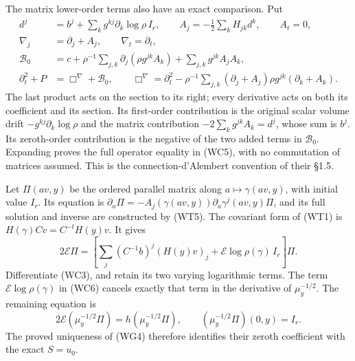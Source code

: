 \documentclass[
  11pt,
]{article}
\begin{document}
The matrix lower-order terms also have an exact comparison. Put \[
\begin{split}
 d^j&=b^j+\sum_k g^{kj}\partial_k\log\rho\,I_r,\qquad
 A_j=-\frac12\sum_k H_{jk}d^k,\qquad A_t=0,\\
 \nabla_j&=\partial_j+A_j,\qquad \nabla_t=\partial_t,\\
 \mathcal B_0&=c+\rho^{-1}\sum_{j,k}
                       \partial_j(\rho g^{jk}A_k)
                    +\sum_{j,k}g^{jk}A_jA_k,\\
 \partial_t^2+P&=\Box^\nabla+\mathcal B_0,\qquad
 \Box^\nabla=\partial_t^2-
       \rho^{-1}\sum_{j,k}(\partial_j+A_j)
                              \rho g^{jk}(\partial_k+A_k).
\end{split}
 \tag{WC5}
\] The last product acts on the section to its right; every derivative
acts on both its coefficient and its section. Its first-order
contribution is the original scalar volume drift
\(-g^{kj}\partial_k\log\rho\) and the matrix contribution
\(-2\sum_k g^{jk}A_k=d^j\), whose sum is \(b^j\). Its zeroth-order
contribution is the negative of the two added terms in \(\mathcal B_0\).
Expanding proves the full operator equality in (WC5), with no
commutation of matrices assumed. This is the connection-d'Alembert
convention of their §1.5.

Let \(\Pi(av,y)\) be the ordered parallel matrix along
\(a\mapsto\gamma(av,y)\), with initial value \(I_r\). Its equation is
\(\partial_a\Pi=-A_j(\gamma(av,y))\partial_a\gamma^j(av,y)\Pi\), and its
full solution and inverse are constructed by (WT5). The covariant form
of (WT1) is \(H(\gamma)Cv=C^{-t}H(y)v\). It gives \[
 2\mathcal E\Pi=
 \left[\sum_j(C^{-1}b)^j(H(y)v)_j+
                         \mathcal E\log\rho(\gamma)\,I_r\right]\Pi .
 \tag{WC6}
\] Differentiate (WC3), and retain its two varying logarithmic terms.
The term \(\mathcal E\log\rho(\gamma)\) in (WC6) cancels exactly that
term in the derivative of \(\mu_y^{-1/2}\). The remaining equation is \[
 2\mathcal E(\mu_y^{-1/2}\Pi)
          =h(\mu_y^{-1/2}\Pi),\qquad
          (\mu_y^{-1/2}\Pi)(0,y)=I_r.
 \tag{WC7}
\] The proved uniqueness of (WG4) therefore identifies their zeroth
coefficient with the exact \(S=u_0\).
\end{document}
